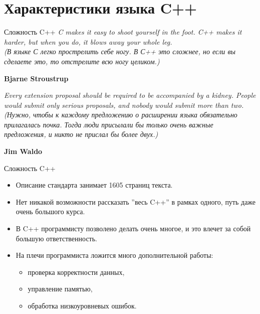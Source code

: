 \documentclass[9pt]{beamer}
\begin{document}
\section{Характеристики языка C++}
\begin{frame}{Сложность C++}
    \textit{C makes it easy to shoot yourself in the foot. C++ makes it harder,
    but when you do, it blows away your whole leg.\\
    (В языке С легко прострелить себе ногу. В С++ это сложнее, но
    если вы сделаете это, то отстрелите всю ногу целиком.)}
    \begin{flushright}
        \textbf{Bjarne Stroustrup}
    \end{flushright}
    \vspace{2em}
    
   \textit{ Every extension proposal should be required to be accompanied by
    a kidney. People would submit only serious proposals, and nobody
    would submit more than two.\\
    (Нужно, чтобы к каждому предложению о расширении языка
    обязательно прилагалась почка. Тогда люди присылали бы
    только очень важные предложения, и никто не прислал бы
    более двух.)}
    \begin{flushright}
        \textbf{Jim Waldo}
    \end{flushright}
\end{frame}
\begin{frame}{Сложность C++}
    \begin{itemize}
        \item Описание стандарта занимает 1605 страниц текста.
        \item Нет никакой возможности рассказать ”весь C++” в рамках
        одного, путь даже очень большого курса.
        \item В C++ программисту позволено делать очень многое, и это
        влечет за собой большую ответственность.
        \item На плечи программиста ложится много дополнительной
        работы:
        \begin{itemize}
            \item проверка корректности данных,
            \item управление памятью,
            \item обработка низкоуровневых ошибок.
        \end{itemize}        
    \end{itemize}
\end{frame}
\end{document}
